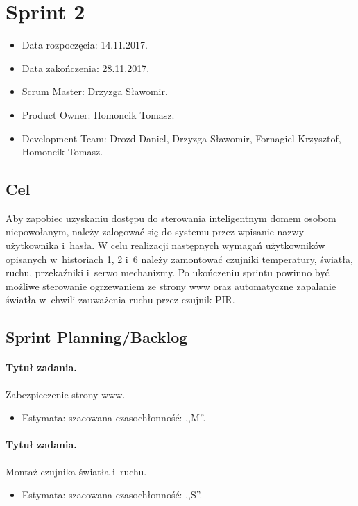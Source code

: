 \section{Sprint 2}
\begin{itemize}
	\item Data rozpoczęcia: 14.11.2017.
	\item Data zakończenia: 28.11.2017.
	\item Scrum Master: Drzyzga Sławomir.
	\item Product Owner: Homoncik Tomasz.
	\item Development Team: Drozd Daniel, Drzyzga Sławomir, Fornagiel Krzysztof, Homoncik Tomasz.
\end{itemize}
\subsection{Cel} 


Aby zapobiec uzyskaniu dostępu do sterowania inteligentnym domem osobom niepowołanym, należy zalogować się do systemu przez wpisanie nazwy użytkownika i~hasła. W celu realizacji następnych wymagań użytkowników opisanych w~historiach 1, 2 i~6 należy zamontować czujniki temperatury, światła, ruchu, przekaźniki i~serwo mechanizmy. Po ukończeniu sprintu powinno być możliwe sterowanie ogrzewaniem ze strony www oraz automatyczne zapalanie światła w~chwili zauważenia ruchu przez czujnik PIR. 



\subsection{Sprint Planning/Backlog}

\paragraph{Tytuł zadania.} Zabezpieczenie strony www.
\begin{itemize}
	\item Estymata: szacowana czasochłonność: ,,M''.
\end{itemize}

\paragraph{Tytuł zadania.} Montaż czujnika światła i~ruchu.
\begin{itemize}
	\item Estymata: szacowana czasochłonność: ,,S''.
\end{itemize}

